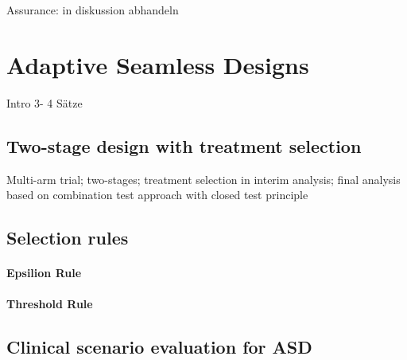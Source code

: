 \documentclass[bimj,fleqn]{w-art}
\theoremstyle{plain}
\theoremstyle{definition}
\begin{document}





Assurance: \cite{stallard_optimal_2009} in diskussion abhandeln

\section{Adaptive Seamless Designs}
\label{sec:adaptive_seamless_designs}

Intro 3- 4 Sätze

\subsection{Two-stage design with treatment selection}
\label{ssec:two_stage_design_with_treatment_selection}

Multi-arm trial; two-stages; treatment selection in interim analysis; final analysis based on combination test approach with closed test principle


\subsection{Selection rules}
\label{ssec:selection_rules}

\paragraph{Epsilion Rule}

\paragraph{Threshold Rule}

\subsection{Clinical scenario evaluation for ASD}
\label{ssec:clinical_scenario_evaluation_for_asd}
\end{document}
